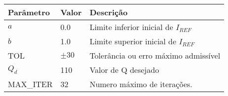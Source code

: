 \begin{tabular}{@{}lll@{}}
\toprule
\textbf{Parâmetro} & \textbf{Valor} & \textbf{Descrição}                   \\ \midrule
$a$                & 0.0            & Limite inferior inicial de $I_{REF}$ \\
$b$                & 1.0            & Limite superior inicial de $I_{REF}$ \\
TOL                & $\pm 30$       & Tolerância ou erro máximo admissível \\
$Q_d$              & 110            & Valor de Q desejado                  \\
MAX\_ITER           & 32             & Numero máximo de iterações.          \\ \bottomrule
\end{tabular}